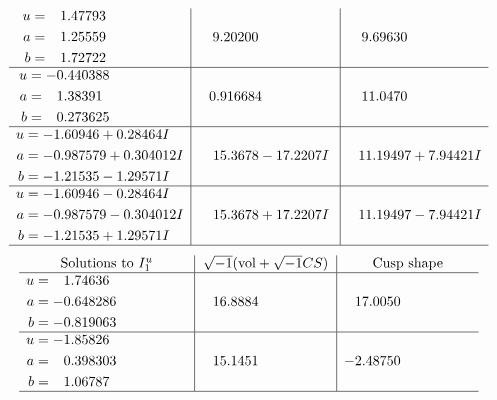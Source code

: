 \documentclass[1p]{elsarticle_modified}
\theoremstyle{definition}
\newcommand{\I}{\sqrt{-1}}
\begin{document}
$$\begin{array}{c|c|c}
\begin{aligned}
u &= \phantom{-}1.47793\phantom{ +0.000000I} \\
a &= \phantom{-}1.25559\phantom{ +0.000000I} \\
b &= \phantom{-}1.72722\phantom{ +0.000000I}\end{aligned}
 & \phantom{-}9.20200\phantom{ +0.000000I} & \phantom{-}9.69630\phantom{ +0.000000I} \\ \hline\begin{aligned}
u &= -0.440388\phantom{ +0.000000I} \\
a &= \phantom{-}1.38391\phantom{ +0.000000I} \\
b &= \phantom{-}0.273625\phantom{ +0.000000I}\end{aligned}
 & \phantom{-}0.916684\phantom{ +0.000000I} & \phantom{-}11.0470\phantom{ +0.000000I} \\ \hline\begin{aligned}
u &= -1.60946 + 0.28464 I \\
a &= -0.987579 + 0.304012 I \\
b &= -1.21535 - 1.29571 I\end{aligned}
 & \phantom{-}15.3678 - 17.2207 I & \phantom{-}11.19497 + 7.94421 I \\ \hline\begin{aligned}
u &= -1.60946 - 0.28464 I \\
a &= -0.987579 - 0.304012 I \\
b &= -1.21535 + 1.29571 I\end{aligned}
 & \phantom{-}15.3678 + 17.2207 I & \phantom{-}11.19497 - 7.94421 I\\
 \hline 
 \end{array}$$\newpage$$\begin{array}{c|c|c}  
\text{Solutions to }I^u_{1}& \I (\text{vol} + \sqrt{-1}CS) & \text{Cusp shape}\\
 \hline 
\begin{aligned}
u &= \phantom{-}1.74636\phantom{ +0.000000I} \\
a &= -0.648286\phantom{ +0.000000I} \\
b &= -0.819063\phantom{ +0.000000I}\end{aligned}
 & \phantom{-}16.8884\phantom{ +0.000000I} & \phantom{-}17.0050\phantom{ +0.000000I} \\ \hline\begin{aligned}
u &= -1.85826\phantom{ +0.000000I} \\
a &= \phantom{-}0.398303\phantom{ +0.000000I} \\
b &= \phantom{-}1.06787\phantom{ +0.000000I}\end{aligned}
 & \phantom{-}15.1451\phantom{ +0.000000I} & -2.48750\phantom{ +0.000000I}\\
 \hline 
 \end{array}$$\newpage\newpage\renewcommand{\arraystretch}{1}
\end{document}
